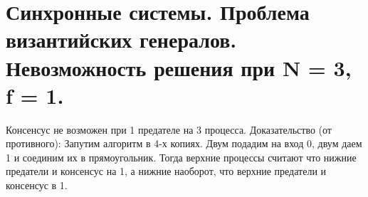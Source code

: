 \section{Синхронные системы. Проблема византийских генералов. Невозможность решения при N = 3, f = 1.}

Консенсус не возможен при 1 предателе на 3 процесса.
Доказательство (от противного):
Запутим алгоритм в 4-х копиях. Двум подадим на вход 0, двум даем 1 и соединим их в прямоугольник.
Тогда верхние процессы считают что нижние предатели и консенсус на 1, а нижние наоборот, что верхние предатели и консенсус в 1.